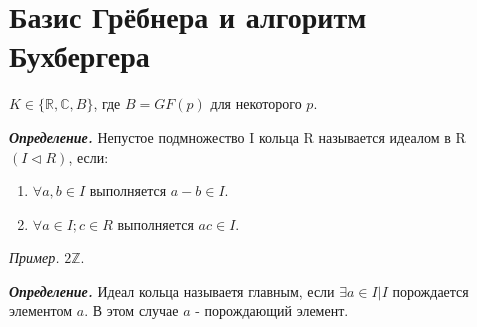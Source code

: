 \documentclass[12pt]{article}
\begin{document}
  


\newcommand{\N}{\mathbb{N}}
\newcommand{\Q}{\mathbb{Q}}
\newcommand{\Z}{\mathbb{Z}}
\newcommand{\K}{\mathbb{K}}
\newcommand{\R}{\mathbb{R}}
\renewcommand{\C}{\mathbb{C}}
\newcommand{\X}{\mathcal{X}}
\newcommand{\hatv}[1]{\overset{\wedge}{\mathstrut#1}}

\newcommand{\opr}{\emph{\textbf{Определение.}} }
\newcommand{\opri}{\emph{\textbf{\underline{Определение.}}} }
\newcommand{\utv}{\emph{\textbf{Утверждение.}} }
\newcommand{\utvi}{\emph{\textbf{\underline{Утверждение.}}} }
\newcommand{\thr}{\emph{\textbf{Теорема.}} }
\newcommand{\thri}{\emph{\textbf{\underline{Теорема.}}} }
\newcommand{\proof}{\emph{Док-во:} }
\newcommand{\lem}{\emph{\textbf{Лемма.}} }
\newcommand{\lemi}{\emph{\textbf{\underline{Лемма.}}} }
\newcommand{\note}{\emph{\textbf{Замечание.}} }
\newcommand{\notei}{\emph{\textbf{\underline{Замечание.}}} }
\newcommand{\conseq}{\emph{\textbf{Следствие.}} }
\newcommand{\example}{\emph{Пример.} }
\newcommand{\examplei}{\emph{\textbf{Пример.}} }
\newcommand{\prop}{\emph{Свойства:} }
\newcommand{\prim}{\emph{Примечание:} }

\newcommand{\map}[3]{\ensuremath{#1: #2 \rightarrow #3}}

\newcommand{\Mod}[1]{\ (\mathrm{mod}\ #1)}

\section {Базис Грёбнера и алгоритм Бухбергера}

$ K \in \{ \R, \C, B\} $, где $B = GF(p)$ для некоторого $p$.

\opr Непустое подмножество I кольца R называется идеалом в R $(I \triangleleft R)$, если:
\begin{enumerate}
	\item $\forall a,b \in I$ выполняется $a - b \in I$. 
	\item $\forall a \in I; c \in R$ выполняется $ac \in I$.
\end{enumerate}

\example $2\Z$.

\opr Идеал кольца называетя главным, если $\exists a \in I | I$ порождается элементом $a$. В этом случае $a$ - порождающий элемент.
\end{document}
